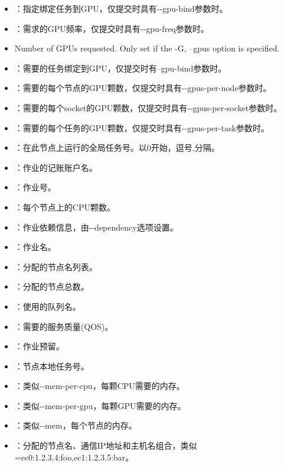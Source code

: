 \begin{itemize}
 	  \item {}：指定绑定任务到GPU，仅提交时具有-{}-gpu-bind参数时。
 	  \item {}：需求的GPU频率，仅提交时具有-{}-gpu-freq参数时。
	  \item {} Number of GPUs requested. Only set if the -G, --gpus option is specified.
	  \item {}：需要的任务绑定到GPU，仅提交时有--gpu-bind参数时。
 	  \item {}：需要的每个节点的GPU颗数，仅提交时具有-{}-gpus-per-node参数时。
 	  \item {}：需要的每个socket的GPU颗数，仅提交时具有-{}-gpus-per-socket参数时。
 	  \item {}：需要的每个任务的GPU颗数，仅提交时具有-{}-gpus-per-task参数时。
      \item {}：在此节点上运行的全局任务号。以0开始，逗号,分隔。
      \item {}：作业的记账账户名。
      \item {}：作业号。
      \item {}：每个节点上的CPU颗数。
      \item {}：作业依赖信息，由-{}-dependency选项设置。
      \item {}：作业名。
      \item {}：分配的节点名列表。
      \item {}：分配的节点总数。
      \item {}：使用的队列名。
      \item {}：需要的服务质量(QOS)。
      \item {}：作业预留。
      \item {}：节点本地任务号。
      \item {}：类似-{}-mem-per-cpu，每颗CPU需要的内存。
      \item {}：类似-{}-mem-per-gpu，每颗GPU需要的内存。
      \item {}：类似-{}-mem，每个节点的内存。
      \item {}：分配的节点名、通信IP地址和主机名组合，类似\\=ec0:1.2.3.4:foo,ec1:1.2.3.5:bar。

\end{itemize}
